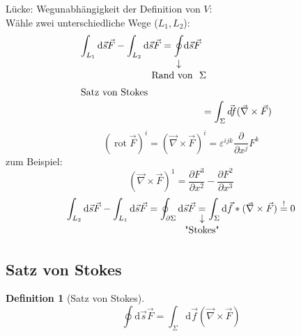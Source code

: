 \documentclass[a4paper]{scrartcl}
\DeclareMathOperator{\rot}{rot}
\renewcommand{\d}{\mathrm{d}}
\renewcommand{\v}[1]{\vec{#1}}
\theoremstyle{definition}
\newtheorem{defn}{Definition}
\theoremstyle{plain}
\theoremstyle{remark}
\theoremstyle{remark}
\begin{document}
Lücke: Wegunabhängigkeit der Definition von $V$: \\
     Wähle zwei unterschiedliche Wege ($L_1, L_2$):
\begin{align*}
\int_{L_1}\d\v s \v F - \int_{L_2}\d \v s \v F = \underarrow[\oint]{\text{Rand von } $\Sigma$} \d\v s\v F \\
\intertext{Satz von Stokes}
&= \int_{\Sigma}\v{d f}(\v\nabla \times\v F)
\end{align*}
\[(\rot \v F)^i = (\v\nabla \times \v F)^i = \varepsilon^{ijk}\frac{\partial}{\partial x^j} F^k\]
zum Beispiel:
\[(\v\nabla\times\v F)^1 = \frac{\partial F^3}{\partial x^2} - \frac{\partial F^2}{\partial x^3}\]
\[\int_{L_2}\d \v s \v F - \int_{L_1}\d \v s\v F = \oint_{\partial \Sigma} \d\v s \v F \underarrow[=]{\text{"Stokes"}} \int_{\Sigma}\d\v f*(\v\nabla\times\v F) \overset{!}{=} 0\]
\subsection{Satz von Stokes}
\label{sec-4-4}
\begin{defn}[Satz von Stokes]
\[\oint \d \v s\v F = \int_{\Sigma} \d \v f (\v \nabla \times \v F)\]
\end{defn}
\end{document}
